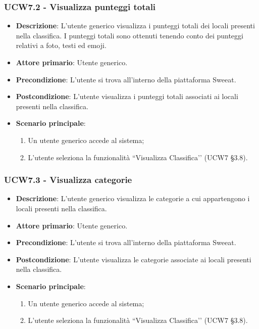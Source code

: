 \subsubsection{UCW7.2 - Visualizza punteggi totali}
\begin{itemize}
	\item \textbf{Descrizione}: L'utente generico visualizza i punteggi totali dei locali presenti nella classifica. I punteggi totali sono ottenuti tenendo conto dei punteggi relativi a foto, testi ed emoji.
    \item \textbf{Attore primario}: Utente generico.
    \item \textbf{Precondizione}: L’utente si trova all’interno della piattaforma Sweeat.
    \item \textbf{Postcondizione}: L’utente visualizza i punteggi totali associati ai locali presenti nella classifica.
    \item \textbf{Scenario principale}: 
    \begin{enumerate}
        \item Un utente generico accede al sistema;
        \item L’utente seleziona la funzionalità “Visualizza Classifica’’ (UCW7 \S{}3.8).
    \end{enumerate}
\end{itemize}

\subsubsection{UCW7.3 - Visualizza categorie}
\begin{itemize}
	\item \textbf{Descrizione}: L'utente generico visualizza le categorie a cui appartengono i locali presenti nella classifica.
    \item \textbf{Attore primario}: Utente generico.
    \item \textbf{Precondizione}: L’utente si trova all’interno della piattaforma Sweeat.
    \item \textbf{Postcondizione}: L’utente visualizza le categorie associate ai locali presenti nella classifica.
    \item \textbf{Scenario principale}: 
    \begin{enumerate}
        \item Un utente generico accede al sistema;
        \item L’utente seleziona la funzionalità “Visualizza Classifica’’ (UCW7 \S{}3.8).
    \end{enumerate}
\end{itemize}

